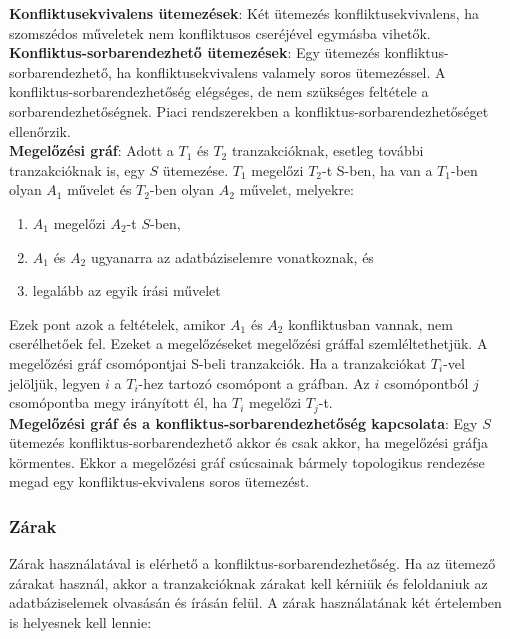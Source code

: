 \documentclass[margin=0px]{article}
\begin{document}
	\noindent \textbf{Konfliktusekvivalens ütemezések}: Két ütemezés konfliktusekvivalens, ha szomszédos műveletek nem konfliktusos
	cseréjével egymásba vihetők.\\
	
	\noindent \textbf{Konfliktus-sorbarendezhető ütemezések}: Egy ütemezés konfliktus-sorbarendezhető, ha konfliktusekvivalens valamely
	soros ütemezéssel. A konfliktus-sorbarendezhetőség elégséges, de nem szükséges feltétele a sorbarendezhetőségnek. Piaci rendszerekben
	a konfliktus-sorbarendezhetőséget ellenőrzik.\\
	
	\noindent \textbf{Megelőzési gráf}: Adott a $T_{1}$ és $T_{2}$ tranzakcióknak, esetleg további tranzakcióknak is, egy $S$ ütemezése.
	$T_{1}$ megelőzi $T_{2}$-t S-ben, ha van a $T_{1}$-ben olyan $A_{1}$ művelet és $T_{2}$-ben olyan $A_{2}$ művelet, melyekre:
	\begin{enumerate}
		\item	$A_{1}$ megelőzi $A_{2}$-t $S$-ben,
		\item	$A_{1}$ és $A_{2}$ ugyanarra az adatbáziselemre vonatkoznak, és
		\item	legalább az egyik írási művelet
	\end{enumerate}
	Ezek pont azok a feltételek, amikor $A_{1}$ és $A_{2}$ konfliktusban vannak, nem cserélhetőek fel. Ezeket a megelőzéseket megelőzési
	gráffal szemléltethetjük. A megelőzési gráf csomópontjai S-beli tranzakciók. Ha a tranzakciókat $T_{i}$-vel jelöljük, legyen $i$
	a $T_{i}$-hez tartozó csomópont a gráfban. Az $i$ csomópontból $j$ csomópontba megy irányított él, ha $T_{i}$ megelőzi $T_{j}$-t.\\
	
	\noindent \textbf{Megelőzési gráf és a konfliktus-sorbarendezhetőség kapcsolata}: Egy $S$ ütemezés konfliktus-sorbarendezhető
	akkor és csak akkor, ha megelőzési gráfja körmentes. Ekkor a megelőzési gráf csúcsainak bármely topologikus rendezése megad
	egy konfliktus-ekvivalens soros ütemezést.
	
	\subsubsection{Zárak}
	
	Zárak használatával is elérhető a konfliktus-sorbarendezhetőség. Ha az ütemező zárakat használ, akkor a tranzakcióknak zárakat
	kell kérniük és feloldaniuk az adatbáziselemek olvasásán és írásán felül. A zárak használatának két értelemben is helyesnek kell
	lennie:
	
\end{document}
